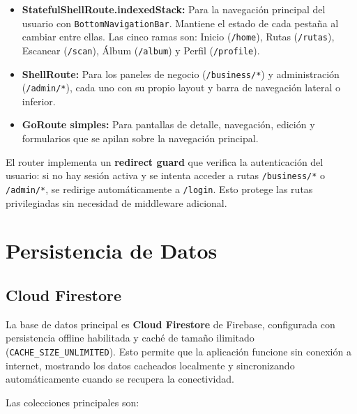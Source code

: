 \documentclass[11pt, a4paper, oneside]{report}
\begin{document}
\begin{itemize}
  \item \textbf{StatefulShellRoute.indexedStack:} Para la navegación principal del usuario con \texttt{BottomNavigationBar}. Mantiene el estado de cada pestaña al cambiar entre ellas. Las cinco ramas son: Inicio (\texttt{/home}), Rutas (\texttt{/rutas}), Escanear (\texttt{/scan}), Álbum (\texttt{/album}) y Perfil (\texttt{/profile}).
  \item \textbf{ShellRoute:} Para los paneles de negocio (\texttt{/business/*}) y administración (\texttt{/admin/*}), cada uno con su propio layout y barra de navegación lateral o inferior.
  \item \textbf{GoRoute simples:} Para pantallas de detalle, navegación, edición y formularios que se apilan sobre la navegación principal.
\end{itemize}

\begin{techbox}
  El router implementa un \textbf{redirect guard} que verifica la autenticación del usuario: si no hay sesión activa y se intenta acceder a rutas \texttt{/business/*} o \texttt{/admin/*}, se redirige automáticamente a \texttt{/login}. Esto protege las rutas privilegiadas sin necesidad de middleware adicional.
\end{techbox}

\section{Persistencia de Datos}

\subsection{Cloud Firestore}
La base de datos principal es \textbf{Cloud Firestore} de Firebase, configurada con persistencia offline habilitada y caché de tamaño ilimitado (\texttt{CACHE\_SIZE\_UNLIMITED}). Esto permite que la aplicación funcione sin conexión a internet, mostrando los datos cacheados localmente y sincronizando automáticamente cuando se recupera la conectividad.

Las colecciones principales son:
\end{document}
